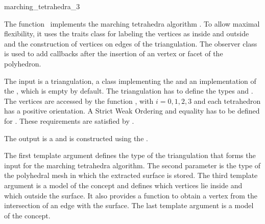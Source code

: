 

\begin{ccRefFunction}{marching_tetrahedra_3}

\ccDefinition

The function \ccRefName\ implements the marching tetrahedra algorithm
\cite{cgal:tpg-rmtiise-99}. To allow maximal flexibility, it uses the
traits class  for labeling the
vertices as inside and outside and the construction of vertices on
edges of the triangulation. The observer class
 is used to add callbacks after the
insertion of an vertex or facet of the polyhedron.

The input is a triangulation, a class implementing the
 and an implementation of the
, which is empty by default. The
triangulation has to define the types  and
. The vertices are accessed by the function
, with $i=0,1,2,3$ and each tetrahedron has a positive
orientation. A Strict Weak Ordering and equality has to be defined for
. These requirements are satisfied by
.

The output is a  and is constructed using the
.


\ccParameters The first template argument defines the type of the
triangulation that forms the input for the marching tetrahedra
algorithm. The second parameter is the type of the polyhedral mesh in
which the extracted surface is stored. The third template argument is
a model of the  concept and defines
which vertices lie inside and which outside the surface. It also
provides a function to obtain a vertex from the intersection of an
edge with the surface. The last template argument is a model of the
 concept.


\end{ccRefFunction}

